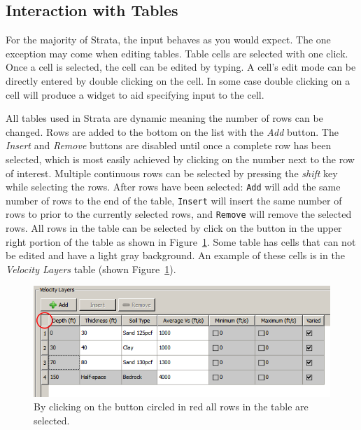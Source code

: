 \documentclass[12pt,oneside]{book}
\begin{document}
\subsection{Interaction with Tables}
For the majority of Strata, the input behaves as you would expect.  The one exception may come when
editing tables. Table cells are selected with one click.  Once a cell is selected, the cell can be
edited by typing.  A cell's edit mode can be directly entered by double clicking on the cell.  In
some case double clicking on a cell will produce a widget to aid specifying input to the cell.

All tables used in Strata are dynamic meaning the number of rows can be changed. Rows are added to
the bottom on the list with the \emph{Add} button.  The \emph{Insert} and \emph{Remove} buttons are
disabled until once a complete row has been selected, which is most easily achieved by clicking on
the number next to the row of interest.  Multiple continuous rows can be selected by pressing the
\emph{shift} key while selecting the rows.  After rows have been selected: \texttt{Add} will add the
same number of rows to the end of the table, \texttt{Insert} will insert the same number of rows to
prior to the currently selected rows, and \texttt{Remove} will remove the selected rows.  All rows
in the table can be selected by click on the button in the upper right portion of the table as shown
in Figure~\ref{fig:strata:allRowsButton}. Some table has cells that can not be edited and have a
light gray background.  An example of these cells is in the \emph{Velocity Layers} table (shown
Figure~\ref{fig:strata:allRowsButton}).

\begin{figure}
    \begin{center}
        \includegraphics[scale=0.65]{figures/strata/allRowsButton.png}
    \end{center}
    \caption{By clicking on the button circled in red all rows in the table are selected.}
    \label{fig:strata:allRowsButton}
\end{figure}
\end{document}
